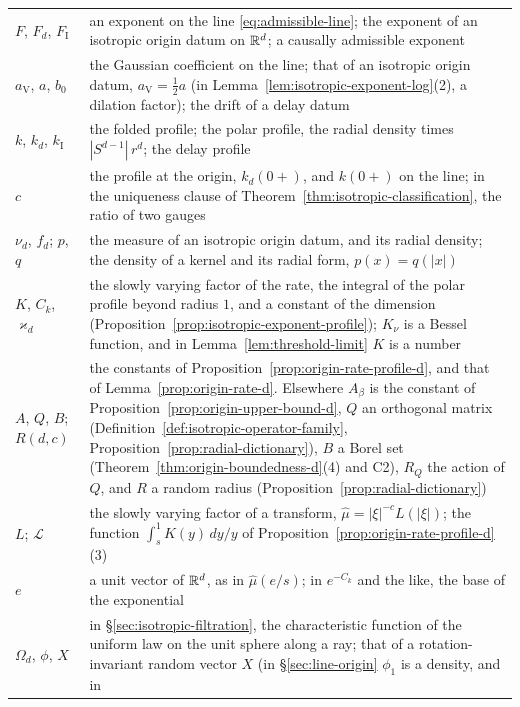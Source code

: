 {\begin{longtable}{@{}N{0.2\textwidth}N{0.76\textwidth}@{}}
$F$, $F_d$, $F_{\mathrm I}$ & an exponent on the line \ref{eq:admissible-line}; the exponent of an
  isotropic origin datum on $\mathbb{R}^d$; a causally admissible exponent \\
$a_{\mathrm V}$, $a$, $b_0$ & the Gaussian coefficient on the line; that of an isotropic origin datum,
  $a_{\mathrm V} = \tfrac12 a$ (in Lemma~\ref{lem:isotropic-exponent-log}(2), a dilation factor);
  the drift of a delay datum \\
$k$, $k_d$, $k_{\mathrm I}$ & the folded profile; the polar profile, the radial \Levy{} density times
  $|S^{d-1}|\,r^d$; the delay profile \\
$c$ & the profile at the origin, $k_d(0{+})$, and $k(0{+})$ on the line; in the uniqueness clause of
  Theorem~\ref{thm:isotropic-classification}, the ratio of two gauges \\
$\nu_d$, $f_d$; $p$, $q$ & the \Levy{} measure of an isotropic origin datum, and its radial
  density; the density of a kernel and its radial form, $p(x) = q(|x|)$ \\
$K$, $C_k$, $\varkappa_d$ & the slowly varying factor of the rate, the integral of the
  polar profile beyond radius $1$, and a constant of the dimension
  (Proposition~\ref{prop:isotropic-exponent-profile}); $K_\nu$ is a Bessel function, and in
  Lemma~\ref{lem:threshold-limit} $K$ is a number \\
$A$, $Q$, $B$; $R(d,c)$ & the constants of Proposition~\ref{prop:origin-rate-profile-d}, and that
  of Lemma~\ref{prop:origin-rate-d}. Elsewhere $A_\beta$ is the constant of
  Proposition~\ref{prop:origin-upper-bound-d}, $Q$ an orthogonal matrix
  (Definition~\ref{def:isotropic-operator-family}, Proposition~\ref{prop:radial-dictionary}), $B$
  a Borel set (Theorem~\ref{thm:origin-boundedness-d}(4) and C2), $R_Q$ the action of $Q$, and
  $R$ a random radius (Proposition~\ref{prop:radial-dictionary}) \\
$L$; $\mathcal{L}$ & the slowly varying factor of a transform, $\widehat\mu = |\xi|^{-c}L(|\xi|)$;
  the function $\int_s^1 K(y)\,dy/y$ of Proposition~\ref{prop:origin-rate-profile-d}(3) \\
$e$ & a unit vector of $\mathbb{R}^d$, as in $\widehat\mu(e/s)$; in $e^{-C_k}$ and the like, the base of
  the exponential \\
$\Omega_d$, $\phi$, $X$ & in \S\ref{sec:isotropic-filtration}, the characteristic function of the
  uniform law on the unit sphere along a ray; that of a rotation-invariant random vector $X$
  (in \S\ref{sec:line-origin} $\phi_1$ is a density, and in

\end{longtable}}
